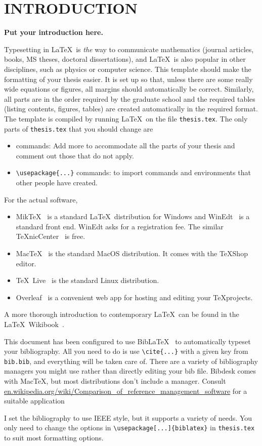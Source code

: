 
\chapter{INTRODUCTION}\label{chap1:introduction}

{\bf Put your introduction here.}


Typesetting in \LaTeX \ is {\em the} way to communicate mathematics
(journal articles, books, MS theses, doctoral dissertations),
and \LaTeX \ is also popular in other disciplines, such as 
physics or computer science. This template should make the formatting
of your thesis easier. It is set up so that, unless there are some really
wide equations or figures, all margins should automatically be correct.
Similarly, all parts are in the order required by the graduate school and 
the required tables (listing contents, figures, tables)
are created automatically in the required format. 
The template is compiled by running \LaTeX \ on 
the file \verb+thesis.tex+. The only parts of 
\verb+thesis.tex+ that you should change are
\begin{itemize}
	\item \verb++ commands: Add more to accommodate all the
	parts of your thesis and comment out those that do not apply. 
	\item \verb+\usepackage{...}+ commands: to import commands
	and environments that other people have created.
\end{itemize}

\newpage
For the actual software,
\begin{itemize}
	\item Mik\TeX~\cite{MiKTeX}
	is a standard \LaTeX\ distribution for Windows and
	WinEdt~\cite{WinEdt} is a standard front end.
	WinEdt asks for a registration fee. 
	The similar \TeX nicCenter~\cite{TeXnicCenter}
	is free. 
	\item Mac\TeX~\cite{MacTeX} is the standard MacOS distribution.
	It comes with the \TeX Shop editor.
	\item \TeX\ Live~\cite{TeXLive} is the standard Linux distribution.
	\item Overleaf~\cite{overleaf} is a convenient web app for hosting and 
	editing your \TeX projects.
\end{itemize}
A more thorough introduction to contemporary \LaTeX\ can be
found in the \LaTeX\ Wikibook~\cite{Wikibook}.

This document has been configured to use Bib\LaTeX~\cite{biblatex} to
automatically typeset your bibliography. All you need to do is use
\verb+\cite{...}+ with a given key from \verb+bib.bib+, and everything
will be taken care of. There are a variety of bibliography managers you might use rather than directly editing your bib file. Bibdesk comes with Mac\TeX, but most distributions don't include a manager. Consult \url{en.wikipedia.org/wiki/Comparison_of_reference_management_software} for a suitable application

I set the bibliography to use IEEE style, but it supports
a variety of needs. You only need to change the options in 
\verb+\usepackage[...]{biblatex}+ in \verb+thesis.tex+ to 
suit most formatting options.